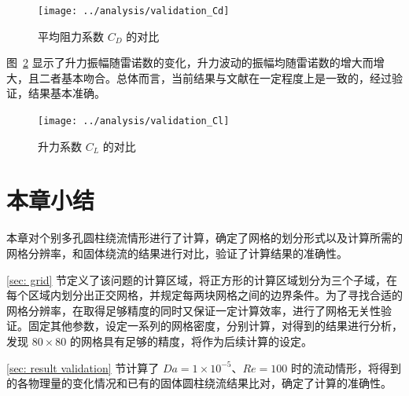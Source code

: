 \begin{figure}[ht]
	\centering
	\texttt{[image: ../analysis/validation\_Cd]}
	\caption{平均阻力系数 $C_D$ 的对比}
	\label{fig: validation-Cd}
\end{figure}

图~\ref{fig: validation-Cl} 显示了升力振幅随雷诺数的变化，升力波动的振幅均随雷诺数的增大而增大，且二者基本吻合。总体而言，当前结果与文献在一定程度上是一致的，经过验证，结果基本准确。

\begin{figure}[t]
	\centering
	\texttt{[image: ../analysis/validation\_Cl]}
	\caption{升力系数 $C_L$ 的对比}
	\label{fig: validation-Cl}
\end{figure}

\section{本章小结}

本章对个别多孔圆柱绕流情形进行了计算，确定了网格的划分形式以及计算所需的网格分辨率，和固体绕流的结果进行对比，验证了计算结果的准确性。

\ref{sec: grid} 节定义了该问题的计算区域，将正方形的计算区域划分为三个子域，在每个区域内划分出正交网格，并规定每两块网格之间的边界条件。为了寻找合适的网格分辨率，在取得足够精度的同时又保证一定计算效率，进行了网格无关性验证。固定其他参数，设定一系列的网格密度，分别计算，对得到的结果进行分析，发现 $80\times 80$ 的网格具有足够的精度，将作为后续计算的设定。

\ref{sec: result validation} 节计算了 $Da=1\times 10^{-5}$、$Re=100$ 时的流动情形，将得到的各物理量的变化情况和已有的固体圆柱绕流结果比对，确定了计算的准确性。
